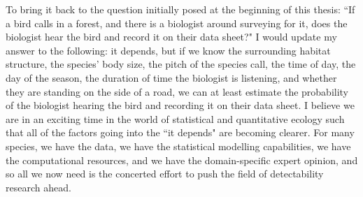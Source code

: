 \par To bring it back to the question initially posed at the beginning of this thesis: ``If a bird calls in a forest, and there is a biologist around surveying for it, does the biologist hear the bird and record it on their data sheet?"
I would update my answer to the following: it depends, but if we know the surrounding habitat structure, the species' body size, the pitch of the species call, the time of day, the day of the season, the duration of time the biologist is listening, and whether they are standing on the side of a road, we can at least estimate the probability of the biologist hearing the bird and recording it on their data sheet.
I believe we are in an exciting time in the world of statistical and quantitative ecology such that all of the factors going into the ``it depends" are becoming clearer.
For many species, we have the data, we have the statistical modelling capabilities, we have the computational resources, and we have the domain-specific expert opinion, and so all we now need is the concerted effort to push the field of detectability research ahead.

